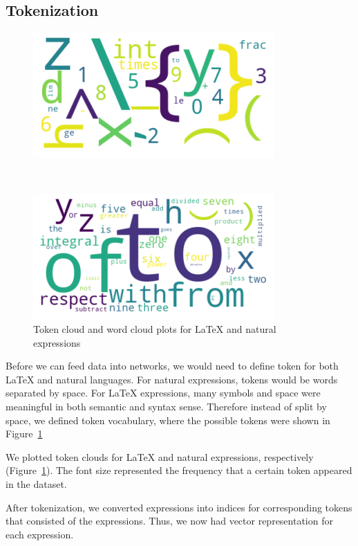 \documentclass{article}
\begin{document}
\subsection{Tokenization}
\begin{figure}[!tbp]
  \centering
  \begin{minipage}[b]{0.4\textwidth}
    \includegraphics[width=\textwidth]{../plot/token_cloud.png}
  \end{minipage}
  \ 
  \begin{minipage}[b]{0.4\textwidth}
    \includegraphics[width=\textwidth]{../plot/word_cloud.png}
  \end{minipage}
  \caption{Token cloud and word cloud plots for LaTeX and natural expressions}
  \label{fig:cloud}
\end{figure}
%
Before we can feed data into networks, we would need to define token for both LaTeX and natural languages. For natural expressions, tokens would be words separated by space. For LaTeX expressions, many symbols and space were meaningful in both semantic and syntax sense. Therefore instead of split by space, we defined token vocabulary, where the possible tokens were shown in Figure~\ref{fig:cloud} \par 
We plotted token clouds for LaTeX and natural expressions, respectively (Figure~\ref{fig:cloud}). The font size represented the frequency that a certain token appeared in the dataset. \par 
After tokenization, we converted expressions into indices for corresponding tokens that consisted of the expressions. Thus, we now had vector representation for each expression. 
%
\end{document}
